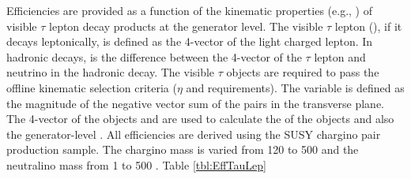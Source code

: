 Efficiencies are provided as a function of the kinematic properties (e.g., \pt) of visible $\tau$ lepton 
decay products at the generator level. The visible $\tau$ lepton (\visTau), if it decays leptonically, 
is defined as the 4-vector of the light charged lepton. In hadronic decays, \visTau is the difference 
between the 4-vector of the $\tau$ lepton and neutrino in the hadronic decay. 
The visible $\tau$ objects are required to pass the offline kinematic selection criteria ($\eta$ and \pt requirements). 
The \genMET variable is defined as the magnitude of the negative vector sum of the \visTau pairs in the transverse plane. 
The 4-vector of the \visTau objects and \genMET are used to calculate the \mt of the \visTau objects and  also the generator-level \mttwo.  
All efficiencies are derived using the SUSY chargino pair production sample. 
The chargino mass is varied from 120 to 500 \GeV and the neutralino mass from 1 to 500 \GeV. 
Table \ref{tbl:EffTauLep}

